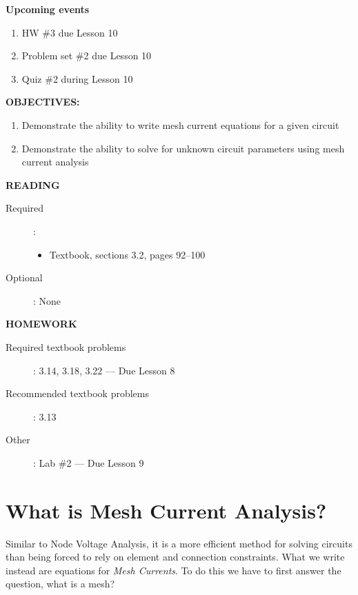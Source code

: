 \documentclass{handout}
\begin{document}
\maketitle

\textbf{Upcoming events}
\begin{enumerate}
\item HW \#3 due Lesson 10
\item Problem set \#2 due Lesson 10
\item Quiz \#2 during Lesson 10
\end{enumerate}

\textbf{OBJECTIVES:}
\begin{enumerate}
\item Demonstrate the ability to write mesh current equations for a given circuit
\item Demonstrate the ability to solve for unknown circuit parameters using mesh current analysis
\end{enumerate}

\textbf{READING}
\begin{description}
\item [Required]:
\begin{itemize}
\item  Textbook, sections 3.2, pages 92--100
\end{itemize}
\item [Optional]: None
\end{description}

\textbf{HOMEWORK}
\begin{description}
\item [Required textbook problems]: 3.14, 3.18, 3.22 --- Due Lesson 8
\item [Recommended textbook problems]: 3.13
\item[Other]: Lab \#2 --- Due Lesson 9
\end{description}


\section{What is Mesh Current Analysis?}
Similar to Node Voltage Analysis, it is a more efficient method for solving circuits than being forced to rely on element and connection constraints.  What we write instead are equations for {\em Mesh Currents}.  To do this we have to first answer the question, what is a mesh?

\end{document}
